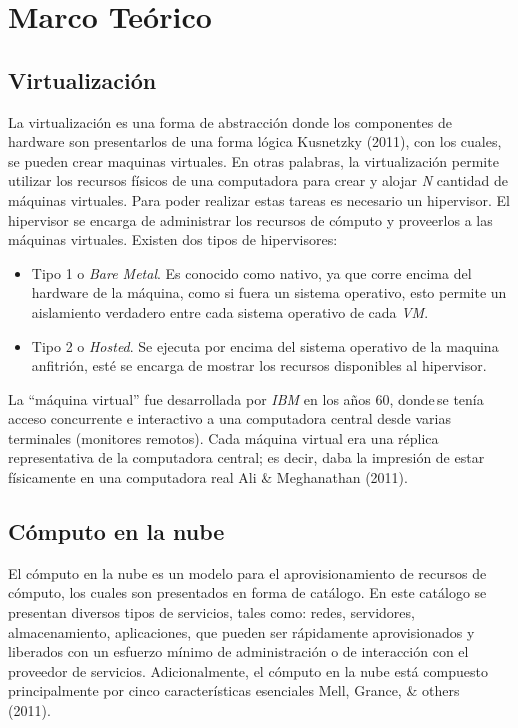 \documentclass[12pt,twoside]{reedthesis}
\theoremstyle{definition}
\theoremstyle{definition}
\theoremstyle{definition}
\theoremstyle{remark}
\begin{document}
\hypertarget{ref_labels}{%
\chapter{Marco Teórico}\label{ref_labels}}

\hypertarget{virtualizacion}{%
\section{Virtualización}\label{virtualizacion}}

La virtualización es una forma de abstracción donde los componentes de
hardware son presentarlos de una forma lógica Kusnetzky (2011), con los
cuales, se pueden crear maquinas virtuales. En otras palabras, la
virtualización permite utilizar los recursos físicos de una computadora
para crear y alojar \emph{N} cantidad de máquinas virtuales. Para poder
realizar estas tareas es necesario un hipervisor. El hipervisor se
encarga de administrar los recursos de cómputo y proveerlos a las
máquinas virtuales. Existen dos tipos de hipervisores:
\begin{itemize}
\item
  Tipo 1 o \emph{Bare Metal}. Es conocido como nativo, ya que corre
  encima del hardware de la máquina, como si fuera un sistema operativo,
  esto permite un aislamiento verdadero entre cada sistema operativo de
  cada \emph{VM}.
\item
  Tipo 2 o \emph{Hosted}. Se ejecuta por encima del sistema operativo de
  la maquina anfitrión, esté se encarga de mostrar los recursos
  disponibles al hipervisor.
\end{itemize}
La ``máquina virtual'' fue desarrollada por \emph{IBM} en los años 60,
donde\,se tenía acceso concurrente e interactivo a una computadora
central desde varias terminales (monitores remotos). Cada máquina
virtual era una réplica representativa de la computadora central; es
decir, daba la impresión de estar físicamente en una computadora real
Ali \& Meghanathan (2011).~

\hypertarget{computo-en-la-nube}{%
\section{Cómputo en la nube}\label{computo-en-la-nube}}

El cómputo en la nube es un modelo para el aprovisionamiento de recursos
de cómputo, los cuales son presentados en forma de catálogo. En este
catálogo se presentan diversos tipos de servicios, tales como: redes,
servidores, almacenamiento, aplicaciones, que pueden ser rápidamente
aprovisionados y liberados con un esfuerzo mínimo de administración o de
interacción con el proveedor de servicios. Adicionalmente, el cómputo en
la nube está compuesto principalmente por cinco características
esenciales Mell, Grance, \& others (2011).~~
\end{document}

